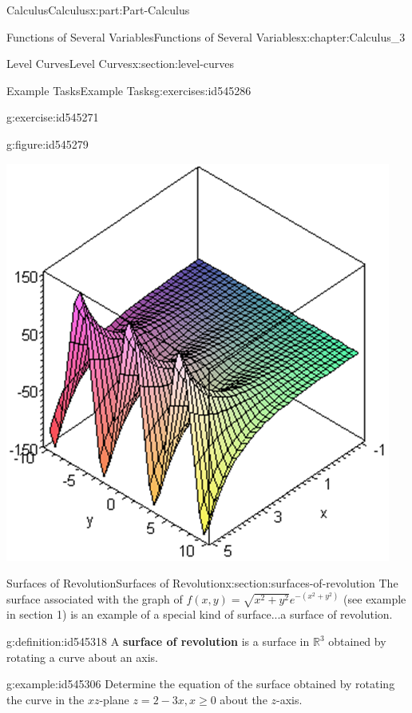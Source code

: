 \documentclass[oneside,10pt,]{book}
\newcommand{\terminology}[1]{\textbf{#1}}
\numberwithin{equation}{section}
\begin{document}
\begin{partptx}{Calculus}{}{Calculus}{}{}{x:part:Part-Calculus}
\begin{chapterptx}{Functions of Several Variables}{}{Functions of Several Variables}{}{}{x:chapter:Calculus_3}
\begin{sectionptx}{Level Curves}{}{Level Curves}{}{}{x:section:level-curves}
\begin{exercises-subsection-numberless}{Example Tasks}{}{Example Tasks}{}{}{g:exercises:id545286}
\begin{divisionexercise}{3}{}{}{g:exercise:id545271}
\begin{figureptx}{}{g:figure:id545279}{}
\begin{image}{0.125}{0.75}{0.125}
\includegraphics[width=\linewidth]{./Calculus/Images/3/2_ET3.png}
\end{image}%
\tcblower
\end{figureptx}%
\end{divisionexercise}%
\end{exercises-subsection-numberless}
\end{sectionptx}
%
%
\typeout{************************************************}
\typeout{************************************************}
%
\begin{sectionptx}{Surfaces of Revolution}{}{Surfaces of Revolution}{}{}{x:section:surfaces-of-revolution}
The surface associated with the graph of \(f(x,y)=\sqrt{x^2+y^2}e^{-(x^2+y^2)}\) (see example in section 1) is an example of a special kind of surface...a surface of revolution. \begin{definition}{}{g:definition:id545318}%
A \terminology{surface of revolution} is a surface in \(\mathbb{R}^3\) obtained by rotating a curve about an axis.\end{definition}
%
\begin{example}{}{g:example:id545306}%
Determine the equation of the surface obtained by rotating the curve in the \(xz\)-plane \(z=2-3x, x\geq 0\) about the \(z\)-axis.%

\end{example}
\end{sectionptx}
\end{chapterptx}
\end{partptx}
\end{document}
